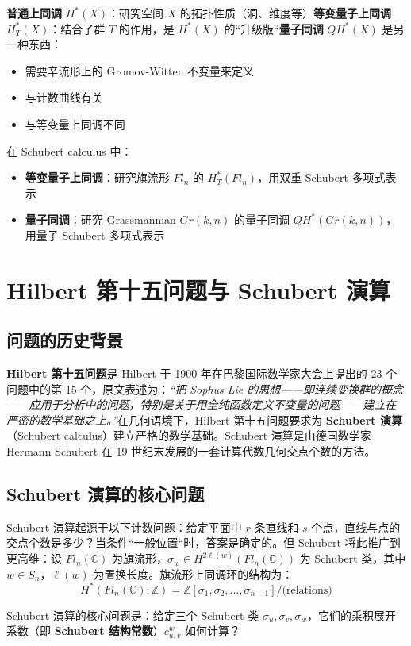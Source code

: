 \textbf{普通上同调} $H^*(X)$：研究空间 $X$ 的拓扑性质（洞、维度等）\textbf{等变量子上同调} $H_T^*(X)$：结合了群 $T$ 的作用，是 $H^*(X)$ 的``升级版``\textbf{量子同调} $QH^*(X)$ 是另一种东西：
\begin{itemize}
\item 需要辛流形上的 Gromov-Witten 不变量来定义
\item 与计数曲线有关
\item 与等变量上同调不同
\end{itemize}在 Schubert calculus 中：
\begin{itemize}
\item \textbf{等变量子上同调}：研究旗流形 $Fl_n$ 的 $H^*_T(Fl_n)$，用双重 Schubert 多项式表示
\item \textbf{量子同调}：研究 Grassmannian $Gr(k,n)$ 的量子同调 $QH^*(Gr(k,n))$，用量子 Schubert 多项式表示
\end{itemize}
\section{Hilbert 第十五问题与 Schubert 演算}\label{app:Hilbert15}
\subsection{问题的历史背景}\textbf{Hilbert 第十五问题}是 Hilbert 于 1900 年在巴黎国际数学家大会上提出的 23 个问题中的第 15 个，原文表述为：\textit{``把 Sophus Lie 的思想——即连续变换群的概念——应用于分析中的问题，特别是关于用全纯函数定义不变量的问题——建立在严密的数学基础之上。''}在几何语境下，Hilbert 第十五问题要求为 \textbf{Schubert 演算}（Schubert calculus）建立严格的数学基础。Schubert 演算是由德国数学家 Hermann Schubert 在 19 世纪末发展的一套计算代数几何交点个数的方法。
\subsection{Schubert 演算的核心问题}Schubert 演算起源于以下计数问题：给定平面中 $r$ 条直线和 $s$ 个点，直线与点的交点个数是多少？当条件``一般位置``时，答案是确定的。但 Schubert 将此推广到更高维：设 $Fl_n(\mathbb{C})$ 为旗流形，$\sigma_w \in H^{2\ell(w)}(Fl_n(\mathbb{C}))$ 为 Schubert 类，其中 $w \in S_n$，$\ell(w)$ 为置换长度。旗流形上同调环的结构为：
\begin{equation}
H^*(Fl_n(\mathbb{C}); \mathbb{Z}) = \mathbb{Z}[\sigma_1, \sigma_2, \ldots, \sigma_{n-1}] / \text{(relations)}
\end{equation}

Schubert 演算的核心问题是：给定三个 Schubert 类 $\sigma_u, \sigma_v, \sigma_w$，它们的乘积展开系数（即 \textbf{Schubert 结构常数}）$c^w_{u,v}$ 如何计算？

